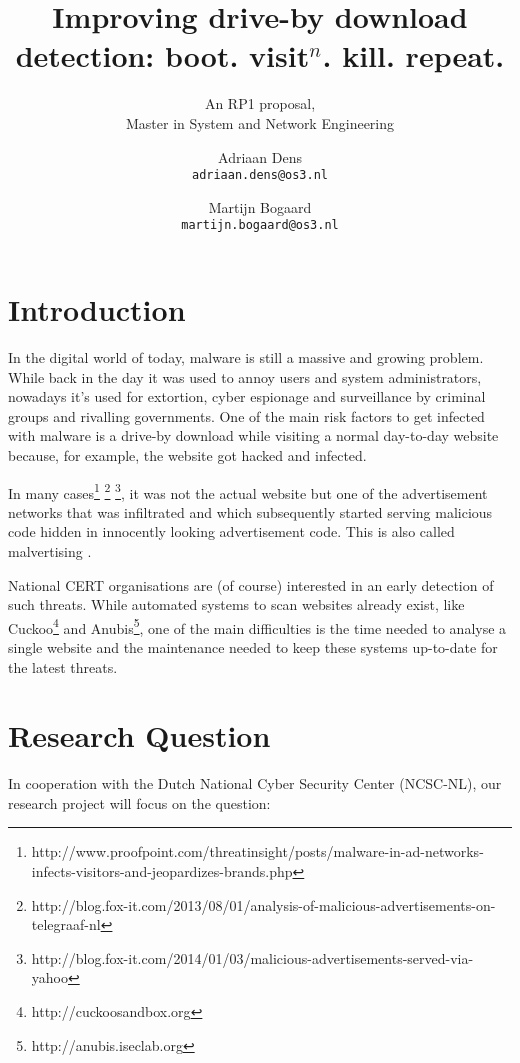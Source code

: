 \documentclass{scrartcl}
\title{Improving drive-by download detection: boot. visit$^n$. kill. repeat.}
\subtitle{An RP1 proposal,\\Master in System and Network Engineering}
\author{
  Adriaan Dens\\
   \texttt{adriaan.dens@os3.nl}
  \and
  Martijn Bogaard\\
   \texttt{martijn.bogaard@os3.nl}
}
\begin{document}
\maketitle

\section{Introduction}

In the digital world of today, malware is still a massive and growing problem. While back in the day it was used to annoy users and system administrators, nowadays it's used for extortion, cyber espionage and surveillance by criminal groups and rivalling governments. One of the main risk factors to get infected with malware is a drive-by download while visiting a normal day-to-day website because, for example, the website got hacked and infected. 

In many cases\footnote{http://www.proofpoint.com/threatinsight/posts/malware-in-ad-networks-infects-visitors-and-jeopardizes-brands.php} \footnote{http://blog.fox-it.com/2013/08/01/analysis-of-malicious-advertisements-on-telegraaf-nl} \footnote{http://blog.fox-it.com/2014/01/03/malicious-advertisements-served-via-yahoo}, it was not the actual website but one of the advertisement networks that was infiltrated and which subsequently started serving malicious code hidden in innocently looking advertisement code. This is also called malvertising \cite{Li2012}.


National CERT organisations are (of course) interested in an early detection of such threats. While automated systems to scan websites already exist, like Cuckoo\footnote{http://cuckoosandbox.org} and Anubis\footnote{http://anubis.iseclab.org}, one of the main difficulties is the time needed to analyse a single website and the maintenance needed to keep these systems up-to-date for the latest threats.

\section{Research Question}
In cooperation with the Dutch National Cyber Security Center (NCSC-NL), our research project will focus on the question:\\ %
\end{document}
